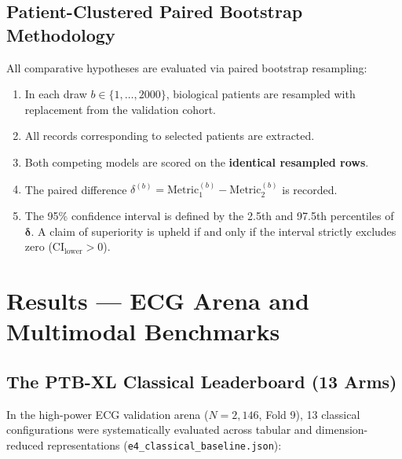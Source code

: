 \documentclass[11pt,a4paper]{report}
\newcommand{\artifact}[1]{\nolinkurl{#1}}
\begin{document}
\section{Patient-Clustered Paired Bootstrap Methodology}
All comparative hypotheses are evaluated via paired bootstrap resampling:
\begin{enumerate}
  \item In each draw $b \in \{1, \dots, 2000\}$, biological patients are resampled with replacement from the validation cohort.
  \item All records corresponding to selected patients are extracted.
  \item Both competing models are scored on the \textbf{identical resampled rows}.
  \item The paired difference $\delta^{(b)} = \text{Metric}_1^{(b)} - \text{Metric}_2^{(b)}$ is recorded.
  \item The 95\% confidence interval is defined by the 2.5th and 97.5th percentiles of $\boldsymbol{\delta}$. A claim of superiority is upheld if and only if the interval strictly excludes zero ($\text{CI}_\text{lower} > 0$).
\end{enumerate}

\chapter{Results --- ECG Arena and Multimodal Benchmarks}

\section{The PTB-XL Classical Leaderboard (13 Arms)}
In the high-power ECG validation arena ($N=2,146$, Fold 9), 13 classical configurations were systematically evaluated across tabular and dimension-reduced representations (\artifact{e4\_classical\_baseline.json}):
\end{document}
